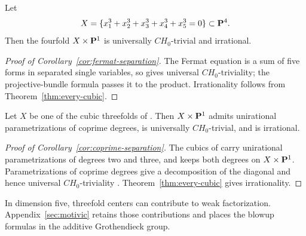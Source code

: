 \begin{corollary}
\label{cor:fermat-separation}
%
%
%
%
Let
\[
  X=\{x_1^3+x_2^3+x_3^3+x_4^3+x_5^3=0\}\subset\mathbf P^4.
\]
Then the fourfold \(X\times\mathbf P^1\) is universally \(CH_0\)-trivial and
irrational.
\end{corollary}

\begin{proof}[Proof of Corollary~\ref{cor:fermat-separation}]
The Fermat equation is a sum of five forms in separated single variables, so
\cite[Theorem~2.8]{CT} gives universal \(CH_0\)-triviality; the projective-bundle formula
passes it to the product.  Irrationality follows from
Theorem~\ref{thm:every-cubic}.
%
%
%
\end{proof}

\begin{corollary}
\label{cor:coprime-separation}
%
%
%
%
Let \(X\) be one of the cubic threefolds of
\cite[Theorem~3.3]{YYZ}.  Then \(X\times\mathbf P^1\) admits unirational
parametrizations of coprime degrees, is universally \(CH_0\)-trivial, and is
irrational.
\end{corollary}

\begin{proof}[Proof of Corollary~\ref{cor:coprime-separation}]
The cubics of \cite[Theorem~3.3]{YYZ} carry unirational parametrizations of
degrees two and three, and \cite[Corollary~3.5]{YYZ} keeps both degrees on
\(X\times\mathbf P^1\).  Parametrizations of coprime degrees give a decomposition
of the diagonal and hence universal \(CH_0\)-triviality
\cite[Section~1]{YYZ}.  Theorem~\ref{thm:every-cubic} gives irrationality.
%
%
%
\end{proof}

In dimension five, threefold centers can contribute to weak factorization.
Appendix~\ref{sec:motivic} retains those contributions and places the blowup
formulas in the additive Grothendieck group.

